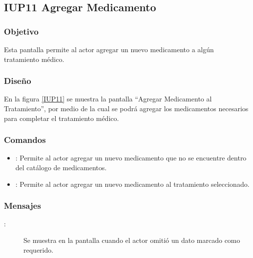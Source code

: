 \subsection{IUP11 Agregar Medicamento}
 
\subsubsection{Objetivo}

    Esta pantalla permite al actor agregar un nuevo medicamento a algún tratamiento médico.

\subsubsection{Diseño}

    En la figura \ref{IUP11} se muestra la pantalla ``Agregar Medicamento al Tratamiento'', por medio de la cual se podrá agregar los medicamentos necesarios para completar el tratamiento médico. \\


\subsubsection{Comandos}
\begin{itemize}
    \item {}: Permite al actor agregar un nuevo medicamento que no se encuentre dentro del catálogo de medicamentos.
    \item {}: Permite al actor agregar un nuevo medicamento al tratamiento seleccionado.
\end{itemize}

\subsubsection{Mensajes}

\begin{description}
    \item[:] Se muestra en la pantalla  cuando el actor omitió un dato marcado como requerido.
   
\end{description}
